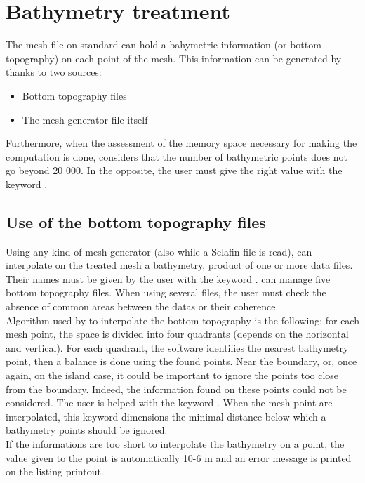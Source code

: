 \chapter{Bathymetry treatment}
The mesh file on \telemacsystem standard can hold a bahymetric information (or
bottom topography) on each point of the mesh. This information can be generated
by \stbtel thanks to two sources:
\begin{itemize}
\item Bottom topography files
\item The mesh generator file itself
\end{itemize}
Furthermore, when the assessment of the memory space necessary for making the
computation is done, \stbtel considers that the number of bathymetric points
does not go beyond 20 000. In the opposite, the user must give the right value
with the keyword .
\section{Use of the bottom topography files}
Using any kind of mesh generator  (also while a Selafin file is read), \stbtel
can interpolate on the treated mesh a bathymetry, product of one or more data
files. Their names must be given by the user with the keyword . \stbtel can manage five bottom topography files. When using
several files, the user  must  check  the absence of common areas between the
datas or their coherence.\\
Algorithm used by \stbtel to interpolate the bottom topography is the
following: for each mesh point, the space is divided into four quadrants
(depends on the horizontal and vertical). For each quadrant, the software
identifies the nearest bathymetry point, then a balance is done using the found
points. Near the boundary, or, once again, on the island case, it could be
important to ignore the points too close from the boundary. Indeed, the
information found on these points could not be considered. The user is helped
with the keyword . When the mesh point are
interpolated, this keyword dimensions the minimal distance below which a
bathymetry points should be ignored.\\
If the \stbtel informations are too short to interpolate the bathymetry on a
point, the value given to the point is automatically 10-6 m and an error
message is printed on the listing printout.

